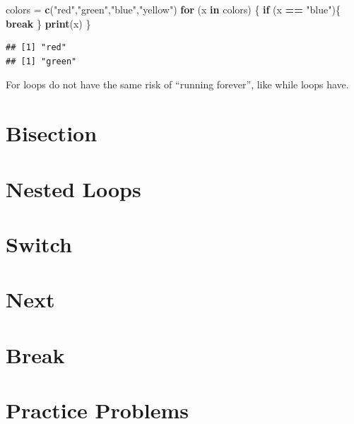 \documentclass[
]{book}
\newenvironment{Shaded}{\begin{snugshade}}{\end{snugshade}}
\newcommand{\ControlFlowTok}[1]{\textcolor[rgb]{0.13,0.29,0.53}{\textbf{#1}}}
\newcommand{\KeywordTok}[1]{\textcolor[rgb]{0.13,0.29,0.53}{\textbf{#1}}}
\newcommand{\NormalTok}[1]{#1}
\newcommand{\OperatorTok}[1]{\textcolor[rgb]{0.81,0.36,0.00}{\textbf{#1}}}
\newcommand{\StringTok}[1]{\textcolor[rgb]{0.31,0.60,0.02}{#1}}
\begin{document}
\begin{Shaded}
\begin{Highlighting}[]
\NormalTok{colors =}\StringTok{ }\KeywordTok{c}\NormalTok{(}\StringTok{"red"}\NormalTok{,}\StringTok{"green"}\NormalTok{,}\StringTok{"blue"}\NormalTok{,}\StringTok{"yellow"}\NormalTok{)}
\ControlFlowTok{for}\NormalTok{ (x }\ControlFlowTok{in}\NormalTok{ colors) \{}
  \ControlFlowTok{if}\NormalTok{ (x }\OperatorTok{==}\StringTok{ "blue"}\NormalTok{)\{}
       \ControlFlowTok{break} 
\NormalTok{  \}}
  \KeywordTok{print}\NormalTok{(x)}
\NormalTok{\}}
\end{Highlighting}
\end{Shaded}

\begin{verbatim}
## [1] "red"
## [1] "green"
\end{verbatim}

For loops do not have the same risk of ``running forever'', like while loops have.

\hypertarget{bisection}{%
\section{Bisection}\label{bisection}}

\hypertarget{nested-loops}{%
\section{Nested Loops}\label{nested-loops}}

\hypertarget{switch}{%
\section{Switch}\label{switch}}

\hypertarget{next}{%
\section{Next}\label{next}}

\hypertarget{break}{%
\section{Break}\label{break}}

\hypertarget{practice-problems}{%
\section*{Practice Problems}\label{practice-problems}}
\end{document}
